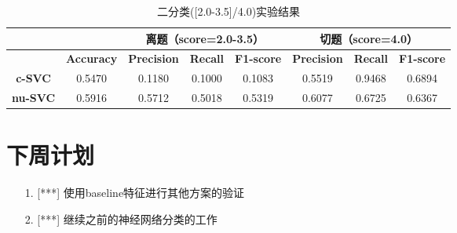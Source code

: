 \documentclass[11pt]{article}
\begin{document}
\begin{CJK}{UTF8}{gkai}
\begin{table}[htbp]
  \centering
  \begin{tabular}{c|c|c|c|c|c|c|c}
    \hline
    \multicolumn{2}{c}{} & \multicolumn{3}{|c|}{\textbf{离题（score=2.0-3.5）}} & \multicolumn{3}{c}{\textbf{切题（score=4.0）}} \\
    \hline
    & \textbf{Accuracy} & \textbf{Precision} & \textbf{Recall} & \textbf{F1-score} & \textbf{Precision} & \textbf{Recall} & \textbf{F1-score} \\
    \hline
    \textbf{c-SVC} & 0.5470  & 0.1180  & 0.1000  & 0.1083  & 0.5519  & 0.9468  & 0.6894  \\
    \hline
    \textbf{nu-SVC} & 0.5916  & 0.5712  & 0.5018  & 0.5319  & 0.6077  & 0.6725  & 0.6367  \\
    \hline
  \end{tabular}%
  \caption{二分类([2.0-3.5]/4.0)实验结果}
  \label{tab:addlabel}%
\end{table}%


\section{下周计划}
\begin{itemize}
\item [1.] [***] 使用baseline特征进行其他方案的验证
\item [2.] [***] 继续之前的神经网络分类的工作
\end{itemize}
%
%
%

\end{CJK}
\end{document}
